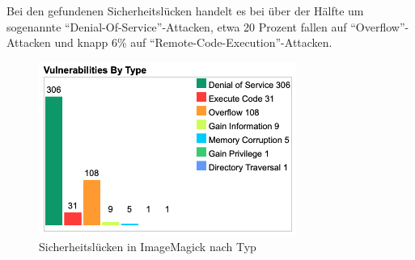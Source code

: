 Bei den gefundenen Sicherheitslücken handelt es bei über der Hälfte um sogenannte "`Denial-Of-Service"'-Attacken, etwa 20 Prozent fallen auf "`Overflow"'-Attacken und knapp 6\% auf "`Remote-Code-Execution"'-Attacken.

\begin{figure}[!hb]\centering
    \includegraphics[width=0.75\textwidth]{img/CVEDetailsVulnsType.png}
    \caption{Sicherheitslücken in ImageMagick nach Typ}
\end{figure}
